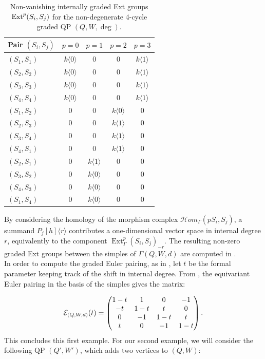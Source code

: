 \begin{table}[h]
\centering
\caption{Non-vanishing internally graded Ext groups $\operatorname{Ext}^p(S_i,S_j)$ for the non-degenerate 4-cycle graded QP $(Q,W,\deg)$.}
\label{table:Ext_groups1}
\begin{tabular}{@{}l c c c c@{}}
\toprule
Pair $(S_i, S_j)$ & $p=0$ & $p=1$ & $p=2$ & $p=3$ \\ 
\midrule
$(S_1, S_1)$ & $k\langle 0 \rangle$ & 0 & 0 & $k\langle 1 \rangle$ \\
$(S_2, S_2)$ & $k\langle 0 \rangle$ & 0 & 0 & $k\langle 1 \rangle$ \\
$(S_3, S_3)$ & $k\langle 0 \rangle$ & 0 & 0 & $k\langle 1 \rangle$ \\
$(S_4, S_4)$ & $k\langle 0 \rangle$ & 0 & 0 & $k\langle 1 \rangle$ \\
\addlinespace
$(S_1, S_2)$ & 0 & 0 & $k\langle 0 \rangle$ & 0 \\
$(S_2, S_3)$ & 0 & 0 & $k\langle 1 \rangle$ & 0 \\
$(S_3, S_4)$ & 0 & 0 & $k\langle 1 \rangle$ & 0 \\
$(S_4, S_1)$ & 0 & 0 & $k\langle 1 \rangle$ & 0 \\
\addlinespace
$(S_2, S_1)$ & 0 & $k\langle 1 \rangle$ & 0 & 0 \\
$(S_3, S_2)$ & 0 & $k\langle 0 \rangle$ & 0 & 0 \\
$(S_4, S_3)$ & 0 & $k\langle 0 \rangle$ & 0 & 0 \\
$(S_1, S_4)$ & 0 & $k\langle 0 \rangle$ & 0 & 0 \\
\bottomrule
\end{tabular}
\end{table}

\noindent By considering the homology of the morphism complex $\mathcal{H}om_{\Gamma}(pS_i, S_j)$, a summand $P_j[h]\langle r\rangle$ contributes a one-dimensional
vector space in internal degree $r$, equivalently to the component $\operatorname{Ext}^p_\Gamma(S_i,S_j)_{-r}$. The resulting non-zero graded Ext groups between the simples of $\Gamma(Q,W,d)$ are computed in .\\

In order to compute the graded Euler pairing, as in , let $t$ be the formal parameter keeping track of the shift in internal degree. From , the equivariant Euler pairing in the basis of the simples gives the matrix:

\[
\mathcal E_{(Q,W,d)}(t) = \begin{pmatrix} 
1 - t & 1 & 0 & -1 \\ 
-t & 1 - t & t & 0 \\ 
0 & -1 & 1 - t & t \\ 
t & 0 & -1 & 1 - t 
\end{pmatrix}.
\]
This concludes this first example. For our second example, we will consider the following QP $(Q',W')$, which adds two vertices to $(Q,W)$:

